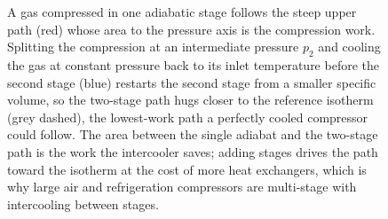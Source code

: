 \begin{figure}[htbp]
\caption[Two-stage compression with intercooling on the $p$-$v$ plane]{A gas
compressed in one adiabatic stage follows the steep upper path (red) whose area
to the pressure axis is the compression work. Splitting the compression at an
intermediate pressure $p_2$ and cooling the gas at constant pressure back to
its inlet temperature before the second stage (blue) restarts the second stage
from a smaller specific volume, so the two-stage path hugs closer to the
reference isotherm (grey dashed), the lowest-work path a perfectly cooled
compressor could follow. The area between the single adiabat and the two-stage
path is the work the intercooler saves; adding stages drives the path toward
the isotherm at the cost of more heat exchangers, which is why large air and
refrigeration compressors are multi-stage with intercooling between stages.}
\label{fig:vol04ch02:two-stage-intercooling}
\end{figure}
